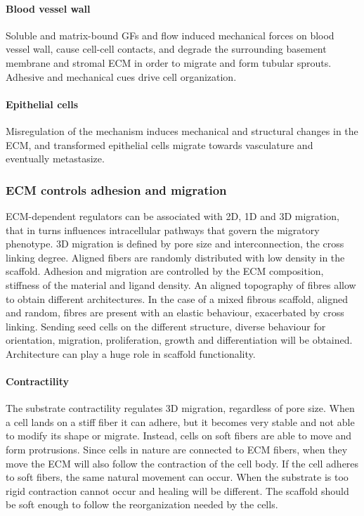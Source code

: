 			\paragraph{Blood vessel wall}
			Soluble and matrix-bound GFs and flow induced mechanical forces on blood vessel wall, cause cell-cell contacts, and degrade the surrounding basement membrane and stromal ECM in order to migrate and form tubular sprouts.
			Adhesive and mechanical cues drive cell organization.

			\paragraph{Epithelial cells}
			Misregulation of the mechanism induces mechanical and structural changes in the ECM, and transformed epithelial cells migrate towards vasculature and eventually metastasize.

		\subsubsection{ECM controls adhesion and migration}
		ECM-dependent regulators can be associated with 2D, 1D and 3D migration, that in turns influences intracellular pathways that govern the migratory phenotype.
		3D migration is defined by pore size and interconnection, the cross linking degree.
		Aligned fibers are randomly distributed with low density in the scaffold.
		Adhesion and migration are controlled by the ECM composition, stiffness of the material and ligand density.
		An aligned topography of fibres allow to obtain different architectures.
		In the case of a mixed fibrous scaffold, aligned and random, fibres are present with an elastic behaviour, exacerbated by cross linking.
		Sending seed cells on the different structure, diverse behaviour for orientation, migration, proliferation, growth and differentiation will be obtained.
		Architecture can play a huge role in scaffold functionality.

			\paragraph{Contractility}
			The substrate contractility regulates 3D migration, regardless of pore size.
			When a cell lands on a stiff fiber it can adhere, but it becomes very stable and not able to modify its shape or migrate.
			Instead, cells on soft fibers are able to move and form protrusions.
			Since cells in nature are connected to ECM fibers, when they move the ECM will also follow the contraction of the cell body.
			If the cell adheres to soft fibers, the same natural movement can occur.
			When the substrate is too rigid contraction cannot occur and healing will be different.
			The scaffold should be soft enough to follow the reorganization needed by the cells.

